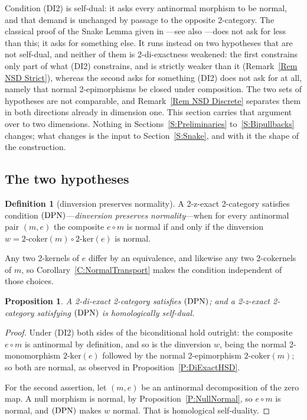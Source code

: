 \documentclass[reqno,a4paper]{amsart}
\numberwithin{equation}{section}
\theoremstyle{plain}
\newtheorem{proposition}[subsection]{Proposition}
\theoremstyle{definition}
\newtheorem{definition}[subsection]{Definition}
\def\nameit#1{\textrm{#1}~}
\def\prox{\nameit{Proposition}}
\def\corx{\nameit{Corollary}}
\def\remx{\nameit{Remark}}
\def\dfn#1{{\itshape #1}}
\newcommand{\comp}{\circ}
\renewcommand{\1}{\onecat{1}}
\newcommand{\DPN}{\textup{(DPN)}}
\newcommand{\twoker}{\ensuremath{2\text{-}\mathrm{ker}}}
\newcommand{\twocoker}{\ensuremath{2\text{-}\mathrm{coker}}}
\begin{document}
Condition \textup{(DI2)} is self-dual: it asks every antinormal morphism to be normal, and that demand is unchanged by passage to the opposite 2-category. The classical proof of the Snake Lemma given in \cite{Borceux-Bourn}---see also \cite{PVdL3}---does not ask for less than this; it asks for something else. It runs instead on two hypotheses that are not self-dual, and neither of them is 2-di-exactness weakened: the first constrains only part of what \textup{(DI2)} constrains, and is strictly weaker than it (\remx\ref{Rem NSD Strict}), whereas the second asks for something \textup{(DI2)} does not ask for at all, namely that normal 2-epimorphisms be closed under composition. The two sets of hypotheses are not comparable, and \remx\ref{Rem NSD Discrete} separates them in both directions already in dimension one. This section carries that argument over to two dimensions. Nothing in Sections~\ref{S:Preliminaries} to~\ref{S:Bipullbacks} changes; what changes is the input to Section~\ref{S:Snake}, and with it the shape of the construction.

\subsection{The two hypotheses}\label{SS:NSDHypotheses}

\begin{definition}[dinversion preserves normality]\label{Def:DPN}
	A 2-z-exact 2-category satisfies condition \(\DPN\)---\dfn{dinversion preserves normality}---when for every antinormal pair \((m,e)\) the composite \(e\comp m\) is normal if and only if the dinversion \(w=\twocoker(m)\comp\twoker(e)\) is normal.
\end{definition}

Any two 2-kernels of \(e\) differ by an equivalence, and likewise any two 2-cokernels of \(m\), so \corx\ref{C:NormalTransport} makes the condition independent of those choices.

\begin{proposition}\label{P:DPNPlace}
	A 2-di-exact 2-category satisfies \(\DPN\); and a 2-z-exact 2-category satisfying \(\DPN\) is homologically self-dual.
\end{proposition}
\begin{proof}
	Under \textup{(DI2)} both sides of the biconditional hold outright: the composite \(e\comp m\) is antinormal by definition, and so is the dinversion \(w\), being the normal 2-monomorphism \(\twoker(e)\) followed by the normal 2-epimorphism \(\twocoker(m)\); so both are normal, as observed in \prox\ref{P:DiExactHSD}.

	For the second assertion, let \((m,e)\) be an antinormal decomposition of the zero map. A null morphism is normal, by \prox\ref{P:NullNormal}, so \(e\comp m\) is normal, and \(\DPN\) makes \(w\) normal. That is homological self-duality.
\end{proof}
\end{document}
